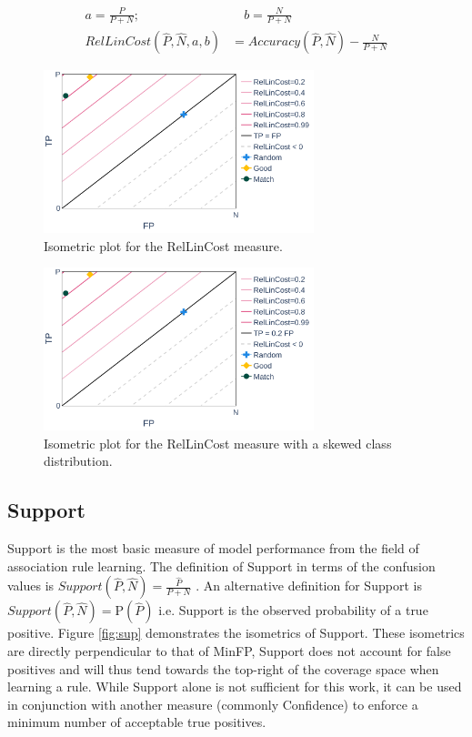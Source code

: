 \begin{equation} \label{eq:rellincost-derive}
    \begin{split}
    a = \frac{P}{P+N}; &\quad
    b = \frac{N}{P+N} \\
		RelLinCost(\hat P, \hat N, a, b) &= Accuracy(\hat P, \hat N) - \frac{N}{P+N}
    \end{split}
\end{equation}
\begin{figure}[ht]
    \centering
    \includegraphics[width=0.7\textwidth]{Figures/MP-RelLinCost}
		\caption{Isometric plot for the RelLinCost measure.}
    \label{fig:rellincost}
\end{figure}
\begin{figure}[ht]
    \centering
    \includegraphics[width=0.7\textwidth]{Figures/MP-RelLinCost-bias}
		\caption{Isometric plot for the RelLinCost measure with a skewed class distribution.}
    \label{fig:rellincost-bias}
\end{figure}

\FloatBarrier
\subsection{Support}

Support is the most basic measure of model performance from the field of association rule learning. The definition of Support in terms of the confusion values is
$Support(\hat P, \hat N) = \frac{\hat P}{P+N}$
. An alternative definition for Support is $Support(\hat P, \hat N) = \text{P}(\hat P)$ i.e. Support is the observed probability of a true positive.
Figure \ref{fig:sup} demonstrates the isometrics of Support. These isometrics are directly perpendicular to that of MinFP, Support does not account for false positives and will thus tend towards the top-right of the coverage space when learning a rule. While Support alone is not sufficient for this work, it can be used in conjunction with another measure (commonly Confidence) to enforce a minimum number of acceptable true positives.

